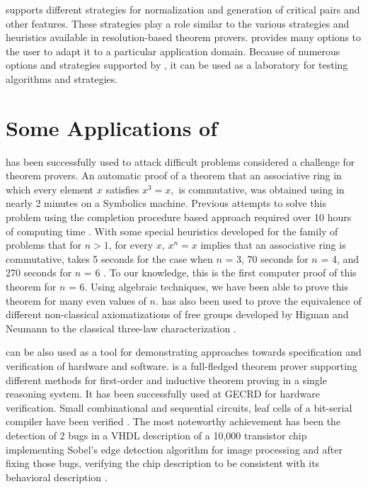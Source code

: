 \RRL supports different strategies for normalization and generation of
critical pairs and other features. These strategies play a role
similar to the various strategies and heuristics available in
resolution-based theorem provers. \RRL provides many options to the
user to adapt it to a particular application domain. Because of
numerous options and strategies supported by \ERRL, it can be used as a
laboratory for testing algorithms and strategies. 

\section{Some Applications of \RRL}
 
\RRL has been successfully used to attack difficult problems
considered a challenge for theorem provers.  An automatic proof of a
theorem that an associative ring in which every element $x$ satisfies
$x^3 = x,$ is commutative, was obtained using \RRL in nearly 2 minutes
on a Symbolics machine.  Previous attempts to solve this problem using
the completion procedure based approach required over 10 hours of
computing time \cite{Stickel84}.  With some special heuristics
developed for the family of problems that for $n > 1$, for every $x$,
$x^n = x$ implies that an associative ring is commutative, \RRL takes
5 seconds for the case when $n$ = 3, 70 seconds for $n$ = 4, and 270
seconds for $n$ = 6 \cite{KMN84,ZK882}.  To our knowledge, this is the
first computer proof of this theorem for $n$ = 6. Using algebraic
techniques, we have been able to prove this theorem for many even
values of $n$. \RRL has also been used to prove the equivalence of
different non-classical axiomatizations of free groups developed by
Higman and Neumann to the classical three-law characterization
\cite{KZ882}.
 
\RRL can be also used as a tool for demonstrating approaches towards
specification and verification of hardware and software.  \RRL is a
full-fledged theorem prover supporting different methods for
first-order and inductive theorem proving in a single reasoning
system.  It has been successfully used at GECRD for hardware
verification. Small combinational and sequential circuits, leaf cells
of a bit-serial compiler have been verified \cite{NS881}. The most
noteworthy achievement has been the detection of 2 bugs in a VHDL
description of a 10,000 transistor chip implementing Sobel's edge
detection algorithm for image processing and after fixing those bugs,
verifying the chip description to be consistent with its behavioral
description \cite{NS882}.

